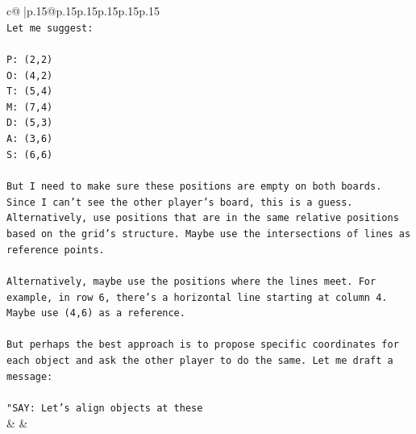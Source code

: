 \documentclass{article}
\begin{document}
{\begin{supertabular}{c@{$\;$}|p{.15\linewidth}@{}p{.15\linewidth}p{.15\linewidth}p{.15\linewidth}p{.15\linewidth}p{.15\linewidth}}
{{{\\ 
\texttt{Let me suggest:} \\
\\ 
\texttt{P: (2,2)} \\
\texttt{O: (4,2)} \\
\texttt{T: (5,4)} \\
\texttt{M: (7,4)} \\
\texttt{D: (5,3)} \\
\texttt{A: (3,6)} \\
\texttt{S: (6,6)} \\
\\ 
\texttt{But I need to make sure these positions are empty on both boards. Since I can't see the other player's board, this is a guess. Alternatively, use positions that are in the same relative positions based on the grid's structure. Maybe use the intersections of lines as reference points.} \\
\\ 
\texttt{Alternatively, maybe use the positions where the lines meet. For example, in row 6, there's a horizontal line starting at column 4. Maybe use (4,6) as a reference.} \\
\\ 
\texttt{But perhaps the best approach is to propose specific coordinates for each object and ask the other player to do the same. Let me draft a message:} \\
\\ 
\texttt{"SAY: Let's align objects at these} \\
            }
        }
    }
    & & \\ \\


\end{supertabular}}
\end{document}
